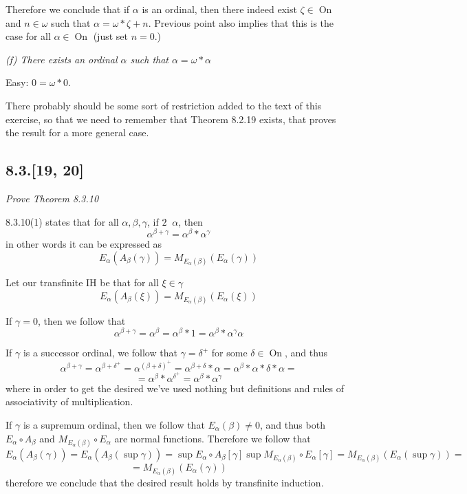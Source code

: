 \documentclass[11pt,oneside,titlepage]{book}
\DeclareMathOperator \On {On}
\DeclareMathOperator \ineq {\underline{\in}}
\begin{document}
Therefore we conclude that if $\alpha$ is an ordinal, then there indeed exist $\zeta \in \On$
and $n \in \omega$ such that $\alpha = \omega * \zeta + n$. Previous point also
implies that this is the case for all $\alpha \in \On$ (just set $n = 0$.)

\textit{(f) There exists an ordinal $\alpha$ such that $\alpha = \omega * \alpha$}

Easy: $0 = \omega * 0$.

There probably should be some sort of restriction added to the text of this exercise,
so that we need to remember that Theorem  8.2.19 exists, that proves the result for
a more general case.

\subsection*{8.3.[19, 20]}

\textit{Prove Theorem 8.3.10}

8.3.10(1) states that for all $\alpha, \beta, \gamma$, if $2 \ineq \alpha$, then 
$$\alpha^{\beta + \gamma} = \alpha^\beta * \alpha^\gamma$$
in other words it can be expressed as
$$E_\alpha(A_\beta(\gamma)) = M_{E_\alpha(\beta)}(E_\alpha(\gamma))$$

Let our transfinite IH be that for all $\xi \in \gamma$
$$E_\alpha(A_\beta(\xi)) = M_{E_\alpha(\beta)}(E_\alpha(\xi))$$

If $\gamma = 0$, then we follow that
$$\alpha^{\beta + \gamma} = \alpha^\beta = \alpha^\beta * 1 = \alpha^\beta * \alpha^\gamma\alpha$$

If $\gamma$ is a successor ordinal, we follow that $\gamma = \delta^+$ for some $\delta \in \On$,
and thus
$$\alpha^{\beta + \gamma} = \alpha^{\beta + \delta^+} =
\alpha^{(\beta + \delta)^+} = \alpha^{\beta + \delta} * \alpha =
\alpha^\beta * \alpha * \delta * \alpha = $$
$$ = \alpha^\beta * \alpha^{\delta^+} = \alpha^\beta * \alpha^\gamma$$
where in order to get the desired  we've used nothing but definitions and rules of associativity
of multiplication.

If $\gamma$ is a supremum ordinal, then we follow that $E_\alpha(\beta) \neq 0$,
and thus both $E_\alpha \circ A_\beta$ and $M_{E_\alpha(\beta)} \circ E_\alpha$ are normal
functions. Therefore we follow that 
$$E_\alpha(A_\beta(\gamma)) = E_\alpha(A_\beta(\sup \gamma)) = \sup E_\alpha \circ A_\beta [\gamma]
\sup M_{E_\alpha(\beta)} \circ E_\alpha[\gamma]
= M_{E_\alpha(\beta)}(E_\alpha(\sup \gamma)) = $$
$$ = M_{E_\alpha(\beta)}(E_\alpha(\gamma))$$
therefore we conclude that the desired result holds by transfinite induction.
\end{document}
